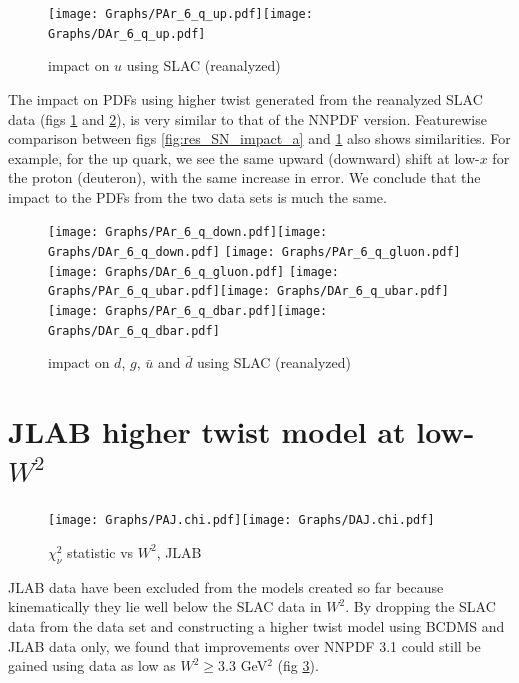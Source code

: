 \documentclass[12pt,a4paper]{report}
\begin{document}
\begin{figure}[H]
\begin{center}
\texttt{[image: Graphs/PAr\_6\_q\_up.pdf]}\texttt{[image: Graphs/DAr\_6\_q\_up.pdf]}
\caption{impact on $u$ using SLAC (reanalyzed)}
\label{fig:res_Sr_impact_a}
\end{center}
\end{figure}

The impact on PDFs using higher twist generated from the reanalyzed SLAC data (figs \ref{fig:res_Sr_impact_a} and \ref{fig:res_Sr_impact_b}), is very similar to that of the NNPDF version. Featurewise comparison between figs \ref{fig:res_SN_impact_a} and \ref{fig:res_Sr_impact_a} also shows similarities. For example, for the up quark, we see the same upward (downward) shift at low-$x$ for the proton (deuteron), with the same increase in error. We conclude that the impact to the PDFs from the two data sets is much the same.

\begin{figure}[H]
\begin{center}
\texttt{[image: Graphs/PAr\_6\_q\_down.pdf]}\texttt{[image: Graphs/DAr\_6\_q\_down.pdf]}
\texttt{[image: Graphs/PAr\_6\_q\_gluon.pdf]}\texttt{[image: Graphs/DAr\_6\_q\_gluon.pdf]}
\texttt{[image: Graphs/PAr\_6\_q\_ubar.pdf]}\texttt{[image: Graphs/DAr\_6\_q\_ubar.pdf]}
\texttt{[image: Graphs/PAr\_6\_q\_dbar.pdf]}\texttt{[image: Graphs/DAr\_6\_q\_dbar.pdf]}
\caption{impact on $d$, $g$, $\bar{u}$ and $\bar{d}$ using SLAC (reanalyzed)}
\label{fig:res_Sr_impact_b}
\end{center}
\end{figure}

\section{JLAB higher twist model at low-$W^2$} \label{sec:ht_impact_JLAB}

\begin{figure}[ht]
\begin{center}
\texttt{[image: Graphs/PAJ.chi.pdf]}\texttt{[image: Graphs/DAJ.chi.pdf]}\\
\caption{$\chi_\nu^2$ statistic vs $W^2$, JLAB}
\label{fig:res_validate_JLAB}
\end{center}
\end{figure}

JLAB data have been excluded from the models created so far because kinematically they lie well below the SLAC data in $W^2$. By dropping the SLAC data from the data set and constructing a higher twist model using BCDMS and JLAB data only, we found that improvements over NNPDF 3.1 could still be gained using data as low as $W^2 \ge 3.3$ GeV$^2$ (fig \ref{fig:res_validate_JLAB}).
\end{document}
